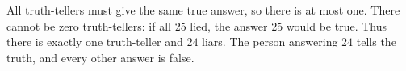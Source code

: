 All truth-tellers must give the same true answer, so there is at most one. There cannot be zero truth-tellers: if all $25$ lied, the answer $25$ would be true. Thus there is exactly one truth-teller and $\boxed{24}$ liars. The person answering $24$ tells the truth, and every other answer is false.
